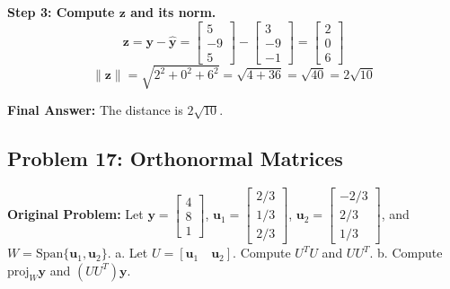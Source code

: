\documentclass[11pt, letterpaper]{article}
\theoremstyle{definition}
\theoremstyle{remark}
\begin{document}
\textbf{Step 3: Compute $\mathbf{z}$ and its norm.}
\[ \mathbf{z} = \mathbf{y} - \hat{\mathbf{y}} = \begin{bmatrix} 5 \\ -9 \\ 5 \end{bmatrix} - \begin{bmatrix} 3 \\ -9 \\ -1 \end{bmatrix} = \begin{bmatrix} 2 \\ 0 \\ 6 \end{bmatrix} \]
\[ \|\mathbf{z}\| = \sqrt{2^2 + 0^2 + 6^2} = \sqrt{4 + 36} = \sqrt{40} = 2\sqrt{10} \]

\textbf{Final Answer:} The distance is $2\sqrt{10}$.

\vspace{1em}
\subsection{Problem 17: Orthonormal Matrices}
\textbf{Original Problem:} Let $\mathbf{y} = \begin{bmatrix} 4 \\ 8 \\ 1 \end{bmatrix}$, $\mathbf{u}_1 = \begin{bmatrix} 2/3 \\ 1/3 \\ 2/3 \end{bmatrix}$, $\mathbf{u}_2 = \begin{bmatrix} -2/3 \\ 2/3 \\ 1/3 \end{bmatrix}$, and $W = \text{Span}\{\mathbf{u}_1, \mathbf{u}_2\}$.
a. Let $U = [\mathbf{u}_1 \quad \mathbf{u}_2]$. Compute $U^T U$ and $U U^T$.
b. Compute $\text{proj}_W \mathbf{y}$ and $(U U^T)\mathbf{y}$.
\end{document}
